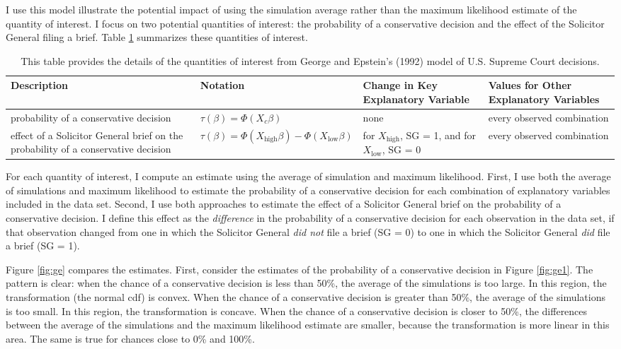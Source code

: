 \documentclass[10pt]{article}
\begin{document}
I use this model illustrate the potential impact of using the simulation average rather than the maximum likelihood estimate of the quantity of interest. 
I focus on two potential quantities of interest: the probability of a conservative decision and the effect of the Solicitor General filing a brief. 
Table \ref{tab:ge-qi} summarizes these quantities of interest. 

\begin{table}[h!]
\centering
\caption{This table provides the details of the quantities of interest from George and Epstein's (1992) model of U.S. Supreme Court decisions.}
\label{tab:ge-qi}
\footnotesize
\begin{tabular}{@{} m{5cm} m{4cm} m{2.5cm}m{4cm}@{}}
\toprule
Description                                                                       & Notation                                                  & Change in Key Explanatory Variable               & Values for Other Explanatory Variables \\ \midrule
probability of a conservative decision                                            & $\tau(\beta) = \Phi(X_c \beta)$                           & none                                             & every observed combination   \\\hline
effect of a Solicitor General brief on the probability of a conservative decision & $\tau(\beta) = \Phi(X_\text{high} \beta) - \Phi(X_\text{low}\beta)$ & for $X_\text{high}$, SG = 1, and for $X_\text{low}$, SG = 0 & every observed combination   \\ \bottomrule
\end{tabular}
\end{table}

For each quantity of interest, I compute an estimate using the average of simulation and maximum likelihood.
First, I use both the average of simulations and maximum likelihood to estimate the probability of a conservative decision for each combination of explanatory variables included in the data set. 
Second, I use both approaches to estimate the effect of a Solicitor General brief on the probability of a conservative decision. 
I define this effect as the \textit{difference} in the probability of a conservative decision for each observation in the data set, if that observation changed from one in which the Solicitor General \emph{did not} file a brief (SG = 0) to one in which the Solicitor General \emph{did} file a brief (SG = 1).

Figure \ref{fig:ge} compares the estimates. 
First, consider the estimates of the probability of a conservative decision in Figure \ref{fig:ge1}.
The pattern is clear: when the chance of a conservative decision is less than 50\%, the average of the simulations is too large. 
In this region, the transformation (the normal cdf) is convex. 
When the chance of a conservative decision is greater than 50\%, the average of the simulations is too small. 
In this region, the transformation is concave. 
When the chance of a conservative decision is closer to 50\%, the differences between the average of the simulations and the maximum likelihood estimate are smaller, because the transformation is more linear in this area. 
The same is true for chances close to 0\% and 100\%.
\end{document}
